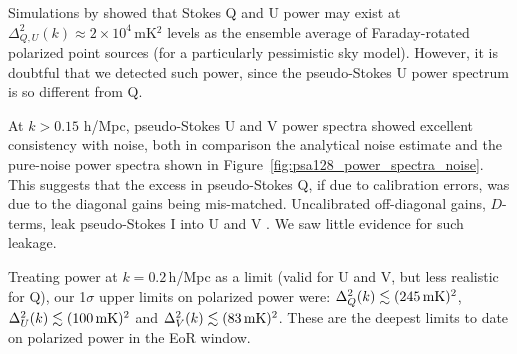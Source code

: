 Simulations by \cite{Nunhokee.17} showed that Stokes Q and U power may exist at $\Delta^2_{Q,U}(k)\approx 2\times10^{4}$\,mK$^2$ levels as the ensemble average of Faraday-rotated polarized point sources (for a particularly pessimistic sky model). However, it is doubtful that we detected such power, since the pseudo-Stokes U power spectrum is so different from Q.

At $k>0.15$ h/Mpc, pseudo-Stokes U and V power spectra showed excellent consistency with noise, both in comparison the analytical noise estimate and the pure-noise power spectra shown in Figure~\ref{fig:psa128_power_spectra_noise}. This suggests that the excess in pseudo-Stokes Q, if due to calibration errors, was due to the diagonal gains being mis-matched. Uncalibrated off-diagonal gains, $D$-terms, leak pseudo-Stokes I into U and V \citep{TMS}. We saw little evidence for such leakage.

Treating power at $k=0.2$\,h/Mpc as a limit (valid for U and V, but less realistic for Q), our 1$\sigma$ upper limits on polarized power were:  $\Delta^2_{Q}(k) \lesssim (245\, {\rm mK})^2$,  $\Delta^2_{U}(k) \lesssim (100\, {\rm mK})^2$ and  $\Delta^2_{V}(k) \lesssim (83\, {\rm mK})^2$. These are the deepest limits to date on polarized power in the EoR window.

